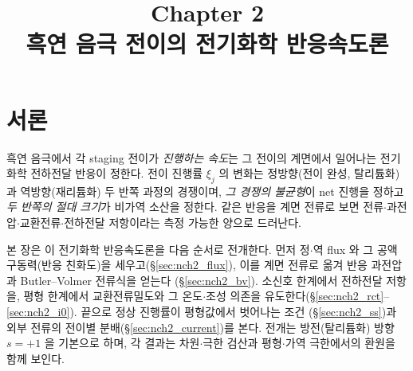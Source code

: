 \documentclass[11pt,a4paper]{article}
\title{\textbf{\LARGE Chapter 2}\\[0.35em]\Large 흑연 음극 전이의 전기화학 반응속도론}
\author{}
\date{}
\begin{document}
\maketitle

\section*{서론}
흑연 음극에서 각 staging 전이가 \emph{진행하는 속도}는 그 전이의 계면에서 일어나는 전기화학 전하전달 반응이
정한다. 전이 진행률 $\xi_j$ 의 변화는 정방향(전이 완성, 탈리튬화)과 역방향(재리튬화) 두 반쪽 과정의 경쟁이며,
\emph{그 경쟁의 불균형}이 net 진행을 정하고 \emph{두 반쪽의 절대 크기}가 비가역 소산을 정한다. 같은 반응을
계면 전류로 보면 전류$\cdot$과전압$\cdot$교환전류$\cdot$전하전달 저항이라는 측정 가능한 양으로 드러난다.

본 장은 이 전기화학 반응속도론을 다음 순서로 전개한다. 먼저 정$\cdot$역 flux 와 그 공액 구동력(반응 친화도)을
세우고(\S\ref{sec:nch2_flux}), 이를 계면 전류로 옮겨 반응 과전압과 Butler--Volmer 전류식을 얻는다
(\S\ref{sec:nch2_bv}). 소신호 한계에서 전하전달 저항을, 평형 한계에서 교환전류밀도와 그 온도$\cdot$조성 의존을
유도한다(\S\ref{sec:nch2_rct}--\ref{sec:nch2_i0}). 끝으로 정상 진행률이 평형값에서 벗어나는 조건
(\S\ref{sec:nch2_ss})과 외부 전류의 전이별 분배(\S\ref{sec:nch2_current})를 본다. 전개는 방전(탈리튬화) 방향
$s=+1$ 을 기본으로 하며, 각 결과는 차원$\cdot$극한 검산과 평형$\cdot$가역 극한에서의 환원을 함께 보인다.

\tableofcontents
\newpage

\end{document}

